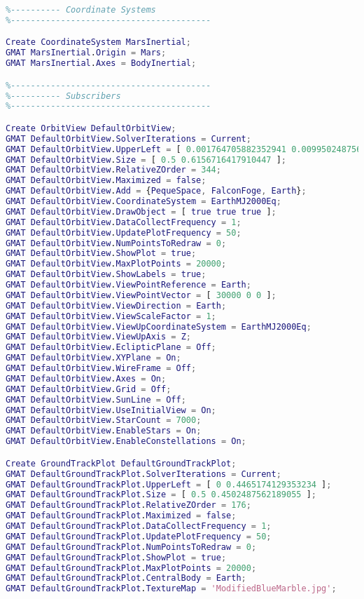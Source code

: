 \begin{lstlisting}[language=MATLAB, caption= Scrit de GMAT]
%----------------------------------------
%---------- Coordinate Systems
%----------------------------------------

Create CoordinateSystem MarsInertial;
GMAT MarsInertial.Origin = Mars;
GMAT MarsInertial.Axes = BodyInertial;

%----------------------------------------
%---------- Subscribers
%----------------------------------------

Create OrbitView DefaultOrbitView;
GMAT DefaultOrbitView.SolverIterations = Current;
GMAT DefaultOrbitView.UpperLeft = [ 0.001764705882352941 0.009950248756218905 ];
GMAT DefaultOrbitView.Size = [ 0.5 0.6156716417910447 ];
GMAT DefaultOrbitView.RelativeZOrder = 344;
GMAT DefaultOrbitView.Maximized = false;
GMAT DefaultOrbitView.Add = {PequeSpace, FalconFoge, Earth};
GMAT DefaultOrbitView.CoordinateSystem = EarthMJ2000Eq;
GMAT DefaultOrbitView.DrawObject = [ true true true ];
GMAT DefaultOrbitView.DataCollectFrequency = 1;
GMAT DefaultOrbitView.UpdatePlotFrequency = 50;
GMAT DefaultOrbitView.NumPointsToRedraw = 0;
GMAT DefaultOrbitView.ShowPlot = true;
GMAT DefaultOrbitView.MaxPlotPoints = 20000;
GMAT DefaultOrbitView.ShowLabels = true;
GMAT DefaultOrbitView.ViewPointReference = Earth;
GMAT DefaultOrbitView.ViewPointVector = [ 30000 0 0 ];
GMAT DefaultOrbitView.ViewDirection = Earth;
GMAT DefaultOrbitView.ViewScaleFactor = 1;
GMAT DefaultOrbitView.ViewUpCoordinateSystem = EarthMJ2000Eq;
GMAT DefaultOrbitView.ViewUpAxis = Z;
GMAT DefaultOrbitView.EclipticPlane = Off;
GMAT DefaultOrbitView.XYPlane = On;
GMAT DefaultOrbitView.WireFrame = Off;
GMAT DefaultOrbitView.Axes = On;
GMAT DefaultOrbitView.Grid = Off;
GMAT DefaultOrbitView.SunLine = Off;
GMAT DefaultOrbitView.UseInitialView = On;
GMAT DefaultOrbitView.StarCount = 7000;
GMAT DefaultOrbitView.EnableStars = On;
GMAT DefaultOrbitView.EnableConstellations = On;

Create GroundTrackPlot DefaultGroundTrackPlot;
GMAT DefaultGroundTrackPlot.SolverIterations = Current;
GMAT DefaultGroundTrackPlot.UpperLeft = [ 0 0.4465174129353234 ];
GMAT DefaultGroundTrackPlot.Size = [ 0.5 0.4502487562189055 ];
GMAT DefaultGroundTrackPlot.RelativeZOrder = 176;
GMAT DefaultGroundTrackPlot.Maximized = false;
GMAT DefaultGroundTrackPlot.DataCollectFrequency = 1;
GMAT DefaultGroundTrackPlot.UpdatePlotFrequency = 50;
GMAT DefaultGroundTrackPlot.NumPointsToRedraw = 0;
GMAT DefaultGroundTrackPlot.ShowPlot = true;
GMAT DefaultGroundTrackPlot.MaxPlotPoints = 20000;
GMAT DefaultGroundTrackPlot.CentralBody = Earth;
GMAT DefaultGroundTrackPlot.TextureMap = 'ModifiedBlueMarble.jpg';


\end{lstlisting}
